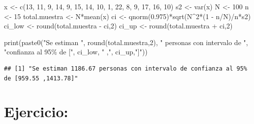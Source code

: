 \documentclass[
]{book}
\newenvironment{Shaded}{\begin{snugshade}}{\end{snugshade}}
\newcommand{\DecValTok}[1]{\textcolor[rgb]{0.00,0.00,0.81}{#1}}
\newcommand{\FloatTok}[1]{\textcolor[rgb]{0.00,0.00,0.81}{#1}}
\newcommand{\FunctionTok}[1]{\textcolor[rgb]{0.00,0.00,0.00}{#1}}
\newcommand{\NormalTok}[1]{#1}
\newcommand{\OtherTok}[1]{\textcolor[rgb]{0.56,0.35,0.01}{#1}}
\newcommand{\SpecialCharTok}[1]{\textcolor[rgb]{0.00,0.00,0.00}{#1}}
\newcommand{\StringTok}[1]{\textcolor[rgb]{0.31,0.60,0.02}{#1}}
\begin{document}
\begin{Shaded}
\begin{Highlighting}[]
\NormalTok{x  }\OtherTok{\textless{}{-}} \FunctionTok{c}\NormalTok{(}\DecValTok{13}\NormalTok{, }\DecValTok{11}\NormalTok{, }\DecValTok{9}\NormalTok{, }\DecValTok{14}\NormalTok{, }\DecValTok{9}\NormalTok{, }\DecValTok{15}\NormalTok{, }\DecValTok{14}\NormalTok{, }\DecValTok{10}\NormalTok{, }\DecValTok{1}\NormalTok{, }\DecValTok{22}\NormalTok{, }\DecValTok{8}\NormalTok{, }\DecValTok{9}\NormalTok{, }\DecValTok{17}\NormalTok{, }\DecValTok{16}\NormalTok{, }\DecValTok{10}\NormalTok{)}
\NormalTok{s2            }\OtherTok{\textless{}{-}} \FunctionTok{var}\NormalTok{(x)}
\NormalTok{N             }\OtherTok{\textless{}{-}} \DecValTok{100}
\NormalTok{n             }\OtherTok{\textless{}{-}} \DecValTok{15}
\NormalTok{total.muestra }\OtherTok{\textless{}{-}}\NormalTok{ N}\SpecialCharTok{*}\FunctionTok{mean}\NormalTok{(x)}
\NormalTok{ci            }\OtherTok{\textless{}{-}} \FunctionTok{qnorm}\NormalTok{(}\FloatTok{0.975}\NormalTok{)}\SpecialCharTok{*}\FunctionTok{sqrt}\NormalTok{(N}\SpecialCharTok{\^{}}\DecValTok{2}\SpecialCharTok{*}\NormalTok{(}\DecValTok{1} \SpecialCharTok{{-}}\NormalTok{ n}\SpecialCharTok{/}\NormalTok{N)}\SpecialCharTok{/}\NormalTok{n}\SpecialCharTok{*}\NormalTok{s2)}
\NormalTok{ci\_low        }\OtherTok{\textless{}{-}} \FunctionTok{round}\NormalTok{(total.muestra }\SpecialCharTok{{-}}\NormalTok{ ci,}\DecValTok{2}\NormalTok{)}
\NormalTok{ci\_up         }\OtherTok{\textless{}{-}} \FunctionTok{round}\NormalTok{(total.muestra }\SpecialCharTok{+}\NormalTok{ ci,}\DecValTok{2}\NormalTok{)}

\FunctionTok{print}\NormalTok{(}\FunctionTok{paste0}\NormalTok{(}\StringTok{"Se estiman "}\NormalTok{, }\FunctionTok{round}\NormalTok{(total.muestra,}\DecValTok{2}\NormalTok{), }\StringTok{" personas con intervalo de "}\NormalTok{,}
             \StringTok{"confianza al 95\% de ["}\NormalTok{, ci\_low, }\StringTok{" ,"}\NormalTok{, ci\_up,}\StringTok{"]"}\NormalTok{))}
\end{Highlighting}
\end{Shaded}

\begin{verbatim}
## [1] "Se estiman 1186.67 personas con intervalo de confianza al 95% de [959.55 ,1413.78]"
\end{verbatim}

\hypertarget{ejercicio-7}{%
\section{Ejercicio:}\label{ejercicio-7}}
\end{document}
